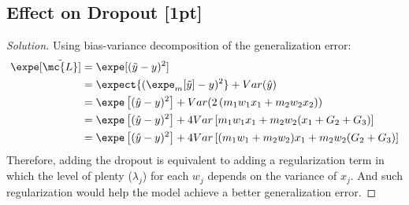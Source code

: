 \documentclass{article}
\begin{document}
	\subsection{Effect on Dropout [1pt]}
	\begin{proof}[Solution]
	Using bias-variance decomposition of the generalization error:
		\begin{align}
			\expe[\tilde{\mc{L}}]
			&= \expe [(\tilde{y} - y)^2] \\
			&= \expect{(\expe_m[\tilde{y}] - y)^2}
			+ Var(\hat{y}) \\
			&= \expe \left[(
				\hat{y} - y
			)^2 \right]
			+ Var(2\left(m_{1} w_{1} x_{1}+m_{2} w_{2} x_{2}\right)) \\
			&= \expe \left[(
				\hat{y} - y
			)^2 \right]
			+ 4 Var\left[m_{1} w_{1} x_{1}+m_{2} w_{2} (x_1 + G_2 + G_3)
			\right] \\
			&= \expe \left[(
				\hat{y} - y
			)^2 \right]
			+ 4 Var\left[(m_{1} w_{1} + m_2 w_2) x_{1} + m_{2} w_{2} (G_2 + G_3)
			\right]
		\end{align}
		Therefore, adding the dropout is equivalent to adding a regularization term in which the level of plenty ($\lambda_j$) for each $w_j$ depends on the variance of $x_j$. And such regularization would help the model achieve a better generalization error.
	\end{proof}
	
\end{document}
